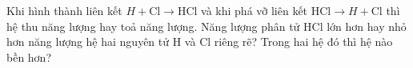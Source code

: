 \begin{bt}
	Khi hình thành liên kết $H+\mathrm{Cl} \to \mathrm{HCl}$ và khi phá vỡ liên kết $\mathrm{HCl} \to H+\mathrm{Cl}$ thì hệ thu năng lượng hay toả năng lượng. Năng lượng phân tử HCl lớn hơn hay nhỏ hơn năng lượng hệ hai nguyên tử H và Cl riêng rẽ? Trong hai hệ đó thì hệ nào bền hơn?
	\loigiai{}
\end{bt}
